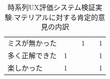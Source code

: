 \begin{table}[htbp]
\begin{tabular}{lrrrrr}
ミスが無かった     &                             &                            & 1                           &                            & 1                                       \\
多く正解できた     & 1                           &                            &                             &                            & 1                                       \\
楽しかった       & 1                           &                            &                             &                            & 1                                       \\ \hline
\end{tabular}
\caption{時系列UX評価システム検証実験:マテリアルに対する肯定的意見の内訳}
\label{table:posi}
\end{table}

